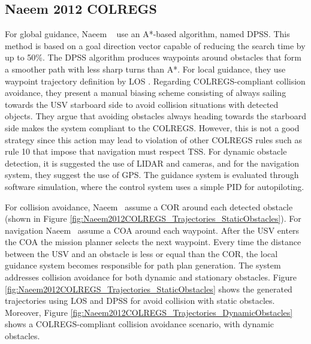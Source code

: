     \subsection{Naeem 2012 COLREGS}
    For global guidance, Naeem \etal~\cite{Naeem2012COLREGS} use an A*-based algorithm, named \ac{DPSS}. 
    This method is based on a goal direction vector capable of reducing the search time by up to 50\%\cite{Yang2010Efficient}. The \ac{DPSS} algorithm produces waypoints around obstacles that form a smoother path with less sharp turns than A*. For local guidance, they use waypoint trajectory definition by \ac{LOS} \cite{Healey1993Multivariable}. Regarding \ac{COLREGS}-compliant collision avoidance, they present a manual biasing scheme consisting of always sailing towards the \ac{USV} starboard side to avoid collision situations with detected objects. They argue that avoiding obstacles always heading towards the starboard side makes the system compliant to the \ac{COLREGS}. However, this is not a good strategy since this action may lead to violation of other \ac{COLREGS} rules such as rule 10 that impose that navigation must respect \acf{TSS}.
    For dynamic obstacle detection, it is suggested the use of \ac{LIDAR} and cameras, and for the navigation system, they suggest the use of \ac{GPS}. The guidance system is evaluated through software simulation, where the control system uses a simple \ac{PID} for autopiloting.
        
    For collision avoidance, Naeem \etal~assume a \ac{COR} around each detected obstacle (shown in Figure \ref{fig:Naeem2012COLREGS_Trajectories_StaticObstacles}). For navigation Naeem \etal~assume a \ac{COA} around each waypoint. After the \ac{USV} enters the \ac{COA} the mission planner selects the next waypoint. Every time the distance between the \ac{USV} and an obstacle is less or equal than the \ac{COR}, the local guidance system becomes responsible for path plan generation. The system addresses collision avoidance for both dynamic and stationary obstacles. Figure \ref{fig:Naeem2012COLREGS_Trajectories_StaticObstacles} shows the generated trajectories using \ac{LOS} and \ac{DPSS} for avoid collision with static obstacles. Moreover, Figure \ref{fig:Naeem2012COLREGS_Trajectories_DynamicObstacles} shows a \ac{COLREGS}-compliant collision avoidance scenario, with dynamic obstacles.
    
